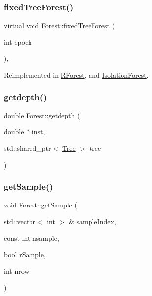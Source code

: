 \mbox{\label{classForest_a0699073aa8d6b46fdbdc36b7299a1a34}} 
\subsubsection{\texorpdfstring{fixed\+Tree\+Forest()}{fixedTreeForest()}}
{\footnotesize\ttfamily virtual void Forest\+::fixed\+Tree\+Forest (\begin{DoxyParamCaption}\item[{int}]{epoch }\end{DoxyParamCaption})\hspace{0.3cm}{\ttfamily [inline]}, {\ttfamily [virtual]}}



Reimplemented in \hyperlink{classRForest_af8c8c06e5875c4a2a539d38ec65c9a7e}{R\+Forest}, and \hyperlink{classIsolationForest_a252267bf58f8bb812c4dca47d5390709}{Isolation\+Forest}.

\mbox{\label{classForest_a977abbe81e409465546cef0164b5b439}} 
\subsubsection{\texorpdfstring{getdepth()}{getdepth()}}
{\footnotesize\ttfamily double Forest\+::getdepth (\begin{DoxyParamCaption}\item[{double $\ast$}]{inst,  }\item[{std\+::shared\+\_\+ptr$<$ \hyperlink{classTree}{Tree} $>$}]{tree }\end{DoxyParamCaption})\hspace{0.3cm}{\ttfamily [virtual]}}

\mbox{\label{classForest_aaa05ed85d49d7b465e518e62f1393210}} 
\subsubsection{\texorpdfstring{get\+Sample()}{getSample()}}
{\footnotesize\ttfamily void Forest\+::get\+Sample (\begin{DoxyParamCaption}\item[{std\+::vector$<$ int $>$ \&}]{sample\+Index,  }\item[{const int}]{nsample,  }\item[{bool}]{r\+Sample,  }\item[{int}]{nrow }\end{DoxyParamCaption})}

